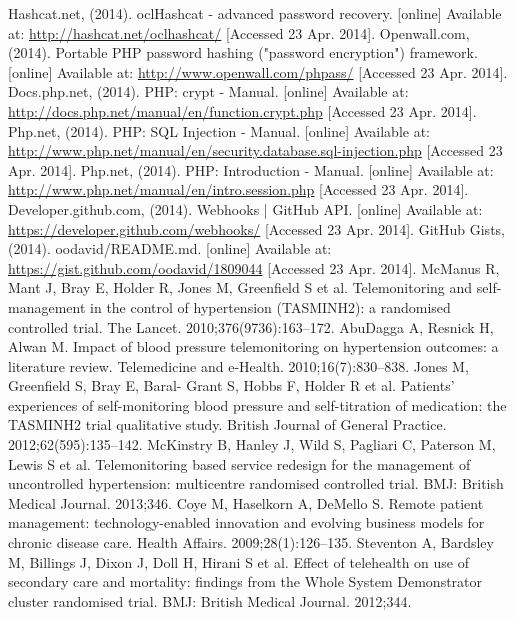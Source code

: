 \documentclass[11pt]{article}
\begin{document}
\begin{thebibliography}{40}
\begin{singlespace}
Hashcat.net, (2014). oclHashcat - advanced password recovery. [online] Available at: \url{http://hashcat.net/oclhashcat/} [Accessed 23 Apr. 2014].
Openwall.com, (2014). Portable PHP password hashing ("password encryption") framework. [online] Available at: \url{http://www.openwall.com/phpass/} [Accessed 23 Apr. 2014].
Docs.php.net, (2014). PHP: crypt - Manual. [online] Available at: \url{http://docs.php.net/manual/en/function.crypt.php} [Accessed 23 Apr. 2014].
Php.net, (2014). PHP: SQL Injection - Manual. [online] Available at: \url{http://www.php.net/manual/en/security.database.sql-injection.php} [Accessed 23 Apr. 2014].
Php.net, (2014). PHP: Introduction - Manual. [online] Available at: \url{http://www.php.net/manual/en/intro.session.php} [Accessed 23 Apr. 2014].
Developer.github.com, (2014). Webhooks | GitHub API. [online] Available at: \url{https://developer.github.com/webhooks/} [Accessed 23 Apr. 2014].
GitHub Gists, (2014). oodavid/README.md. [online] Available at: \url{https://gist.github.com/oodavid/1809044} [Accessed 23 Apr. 2014].
McManus R, Mant J, Bray E, Holder R, Jones M, Greenfield S et al. Telemonitoring and self-management in the control of hypertension (TASMINH2): a randomised controlled trial. The Lancet. 2010;376(9736):163--172. 
AbuDagga A, Resnick H, Alwan M. Impact of blood pressure telemonitoring on hypertension outcomes: a literature review. Telemedicine and e-Health. 2010;16(7):830--838. 
Jones M, Greenfield S, Bray E, Baral- Grant S, Hobbs F, Holder R et al. Patients' experiences of self-monitoring blood pressure and self-titration of medication: the TASMINH2 trial qualitative study. British Journal of General Practice. 2012;62(595):135--142. 
McKinstry B, Hanley J, Wild S, Pagliari C, Paterson M, Lewis S et al. Telemonitoring based service redesign for the management of uncontrolled hypertension: multicentre randomised controlled trial. BMJ: British Medical Journal. 2013;346. 
Coye M, Haselkorn A, DeMello S. Remote patient management: technology-enabled innovation and evolving business models for chronic disease care. Health Affairs. 2009;28(1):126--135. 
Steventon A, Bardsley M, Billings J, Dixon J, Doll H, Hirani S et al. Effect of telehealth on use of secondary care and mortality: findings from the Whole System Demonstrator cluster randomised trial. BMJ: British Medical Journal. 2012;344. 

\end{singlespace}
\end{thebibliography}
\end{document}
